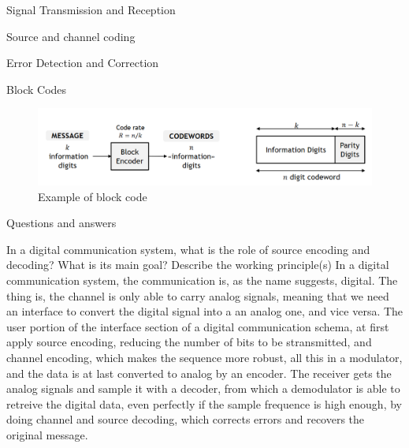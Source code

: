 \begin{section}{Signal Transmission and Reception}
\begin{section}{Source and channel coding}
\begin{subsection}{Error Detection and Correction}
\begin{subsubsection}{Block Codes}
        \begin{figure}[h]
          \centering
          \includegraphics[width=\textwidth]{img/wireless/block codes.png}
          \caption{Example of block code}
          \label{fig:block code}
        \end{figure}
      \end{subsubsection}
    \end{subsection}
  \end{section}
  \begin{section}{Questions and answers}
    \begin{subsubsection}{In a digital communication system, what is the role of source encoding and
      decoding? What is its main goal? Describe the working principle(s)}
      In a digital communication system, the communication is, as the name suggests, digital. The
      thing is, the channel is only able to carry analog signals, meaning that we need an interface
      to convert the digital signal into a an analog one, and vice versa. The user portion of the
      interface section of a digital communication schema, at first apply source encoding, reducing
      the number of bits to be stransmitted, and channel encoding, which makes the sequence more
      robust, all this in a modulator, and the data is at last converted to analog by an encoder.
      The receiver gets the analog signals and sample it with a decoder, from which a demodulator is
      able to retreive the digital data, even perfectly if the sample frequence is high enough, by
      doing channel and source decoding, which corrects errors and recovers the original message.
    \end{subsubsection}


\end{section}
\end{section}
